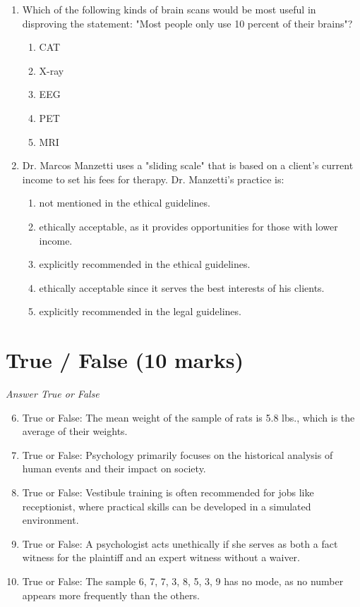 \documentclass[12pt]{article}
\begin{document}
\begin{enumerate}[label=\arabic*.]
\item Which of the following kinds of brain scans would be most useful in disproving the statement: "Most people only use 10 percent of their brains"?
\begin{enumerate}[label=(\alph*)]
    \item CAT
    \item X-ray
    \item EEG
    \item PET
    \item MRI
\end{enumerate}
\item Dr. Marcos Manzetti uses a "sliding scale" that is based on a client's current income to set his fees for therapy. Dr. Manzetti's practice is:
\begin{enumerate}[label=(\alph*)]
    \item not mentioned in the ethical guidelines.
    \item ethically acceptable, as it provides opportunities for those with lower income.
    \item explicitly recommended in the ethical guidelines.
    \item ethically acceptable since it serves the best interests of his clients.
    \item explicitly recommended in the legal guidelines.
\end{enumerate}
\end{enumerate}

\section*{True / False (10 marks)}
\textit{Answer True or False}
\begin{enumerate}[label=\arabic*.]
\setcounter{enumi}{5}
\item True or False: The mean weight of the sample of rats is 5.8 lbs., which is the average of their weights.
\item True or False: Psychology primarily focuses on the historical analysis of human events and their impact on society.
\item True or False: Vestibule training is often recommended for jobs like receptionist, where practical skills can be developed in a simulated environment.
\item True or False: A psychologist acts unethically if she serves as both a fact witness for the plaintiff and an expert witness without a waiver.
\item True or False: The sample 6, 7, 7, 3, 8, 5, 3, 9 has no mode, as no number appears more frequently than the others.
\end{enumerate}
\end{document}
